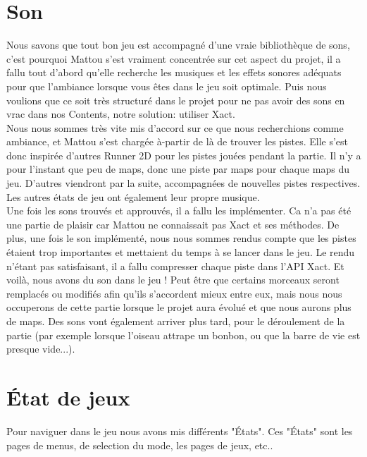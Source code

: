 \documentclass [11pt]{report}
\begin{document}
	\section{Son}
		Nous savons que tout bon jeu est accompagné d'une vraie bibliothèque de sons, c'est pourquoi Mattou s'est vraiment concentrée sur cet aspect du projet, il a fallu tout d'abord qu'elle recherche les musiques et les effets sonores adéquats pour que l'ambiance lorsque vous êtes dans le jeu soit optimale. Puis nous voulions que ce soit très structuré dans le projet pour ne pas avoir des sons en vrac dans nos Contents, notre solution: utiliser Xact. \\
	\indent Nous nous sommes très vite mis d'accord sur ce que nous recherchions comme ambiance, et Mattou s'est chargée à-partir de là  de trouver les pistes. Elle s'est donc inspirée d'autres Runner 2D pour les pistes jouées pendant la partie. Il n'y a pour l'instant que peu de maps, donc une piste par maps pour chaque maps du jeu. D'autres viendront par la suite, accompagnées de nouvelles pistes respectives. Les autres états de jeu ont également leur propre musique. \\
	\indent Une fois les sons trouvés et approuvés, il a fallu les implémenter. Ca n'a pas été une partie de plaisir car Mattou ne connaissait pas Xact et ses méthodes. De plus, une fois le son implémenté, nous nous sommes rendus compte que les pistes étaient trop importantes et mettaient du temps à se lancer dans le jeu. Le rendu n'étant pas satisfaisant, il a fallu compresser chaque piste dans l'API Xact. Et voilà, nous avons du son dans le jeu ! Peut être que certains morceaux seront remplacés ou modifiés afin qu'ils s'accordent mieux entre eux, mais nous nous occuperons de cette partie lorsque le projet aura évolué et que nous aurons plus de maps. Des sons vont  également arriver plus tard, pour le déroulement de la partie (par exemple lorsque l'oiseau attrape un bonbon, ou que la barre de vie est presque vide...).
		
		
		\vspace{10mm}
		
		
		\section{\'Etat de jeux}
		Pour naviguer dans le jeu nous avons mis différents "États". Ces "États" sont les pages de menus, de selection du mode, les pages de jeux, etc.. 
		
		\vspace{4mm}
		
\end{document}
